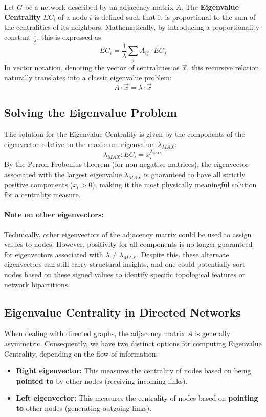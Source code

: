 \begin{definition}
    Let $G$ be a network described by an adjacency matrix $A$. The \textbf{Eigenvalue Centrality} $EC_i$ of a node $i$ is defined such that it is proportional to the sum of the centralities of its neighbors. Mathematically, by introducing a proportionality constant $\frac{1}{\lambda}$, this is expressed as:
    \[ EC_i = \frac{1}{\lambda} \sum_j A_{ij} \cdot EC_j \]
    In vector notation, denoting the vector of centralities as $\vec{x}$, this recursive relation naturally translates into a classic eigenvalue problem:
    \[ A \cdot \vec{x} = \lambda \cdot \vec{x} \]
\end{definition}

\subsection{Solving the Eigenvalue Problem}
The solution for the Eigenvalue Centrality is given by the components of the eigenvector relative to the maximum eigenvalue, $\lambda_{MAX}$:
\[ \lambda_{MAX} : EC_i = x_i^{\lambda_{MAX}} \]
By the Perron-Frobenius theorem (for non-negative matrices), the eigenvector associated with the largest eigenvalue $\lambda_{MAX}$ is guaranteed to have all strictly positive components ($x_i > 0$), making it the most physically meaningful solution for a centrality measure.

\paragraph{Note on other eigenvectors:} Technically, other eigenvectors of the adjacency matrix could be used to assign values to nodes. However, positivity for all components is no longer guaranteed for eigenvectors associated with $\lambda \neq \lambda_{MAX}$. Despite this, these alternate eigenvectors can still carry structural insights, and one could potentially sort nodes based on these signed values to identify specific topological features or network bipartitions.

\subsection{Eigenvalue Centrality in Directed Networks}
When dealing with directed graphs, the adjacency matrix $A$ is generally asymmetric. Consequently, we have two distinct options for computing Eigenvalue Centrality, depending on the flow of information:
\begin{itemize}
    \item \textbf{Right eigenvector:} This measures the centrality of nodes based on being \textbf{pointed to} by other nodes (receiving incoming links).
    \item \textbf{Left eigenvector:} This measures the centrality of nodes based on \textbf{pointing to} other nodes (generating outgoing links).
\end{itemize}


